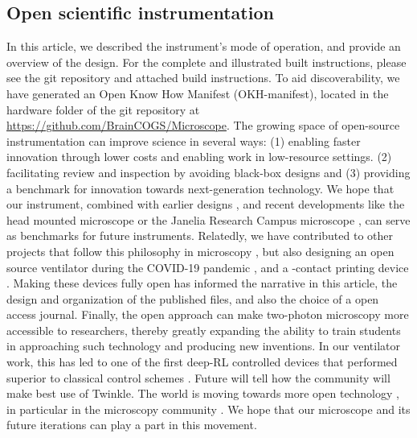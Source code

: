 \documentclass[10pt,letterpaper]{article}
\begin{document}
\subsection*{Open scientific instrumentation}
In this article, we described the instrument's mode of operation, and provide an overview of the design. For the complete and illustrated built instructions, please see the git repository and attached build instructions. To aid discoverability, we have generated an Open Know How Manifest (OKH-manifest), located in the hardware folder of the git repository at \url{https://github.com/BrainCOGS/Microscope}.\newline
The growing space of open-source instrumentation can improve science in several ways: (1) enabling faster innovation through lower costs and enabling work in low-resource settings. (2) facilitating review and inspection by avoiding black-box designs and (3) providing a benchmark for innovation towards next-generation technology. We hope that our instrument, combined with earlier designs \cite{Rosenegger2014, Mayrhofer2015, Tan1999}, and recent developments like the head mounted microscope \cite{Zong2022} or the Janelia Research Campus microscope \cite{Janelia2024}, can serve as benchmarks for future instruments. Relatedly, we have contributed to other projects that follow this philosophy in microscopy \cite{Scott2018}, but also designing an open source ventilator during the COVID-19 pandemic \cite{LaChance2022,POVMC2022}, and a \textmu-contact printing device \cite{Samhaber2016}. Making these devices fully open has informed the narrative in this article, the design and organization of the published files, and also the choice of a open access journal. Finally, the open approach can make two-photon microscopy more accessible to researchers, thereby greatly expanding the ability to train students in approaching such technology and producing new inventions. In our ventilator work, this has led to one of the first deep-RL controlled devices that performed superior to classical control schemes \cite{Suo2021}. Future will tell how the community will make best use of Twinkle. The world is moving towards more open technology \cite{Schottdorf2024}, in particular in the microscopy community \cite{Hohlbein2022}. We hope that our microscope and its future iterations can play a part in this movement.
\end{document}

